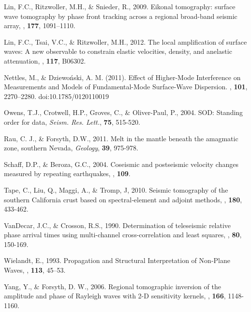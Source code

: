 \documentclass[referee]{gji}
\begin{document}
{{\begin{thebibliography}{}
	   Lin, F.C., Ritzwoller, M.H., \& Snieder, R., 2009. Eikonal tomography: surface wave tomography by phase front tracking across a regional broad-band seismic array, \textit{\gji}, \textbf{177}, 1091–1110. 

	   Lin, F.C., Tsai, V.C., \& Ritzwoller, M.H., 2012. The local amplification of surface waves: A new observable to constrain elastic velocities, density, and anelastic attenuation, \textit{\jgr}, \textbf{117}, B06302.

	   Nettles, M., \& Dziewoński, A. M. (2011). Effect of Higher-Mode Interference on Measurements and Models of Fundamental-Mode Surface-Wave Dispersion. \textit{\bssa}, \textbf{101}, 2270–2280. doi:10.1785/0120110019

	   Owens, T.J., Crotwell, H.P., Groves, C., \& Oliver-Paul, P., 2004. SOD: Standing order for data, \textit{Seism. Res. Lett.}, \textbf{75}, 515-520.

	   Rau, C. J., \& Forsyth, D.W., 2011. Melt in the mantle beneath the amagmatic zone, southern Nevada, \textit{Geology}, \textbf{39}, 975-978.

	   Schaff, D.P., \& Beroza, G.C., 2004. Coseismic and postseismic velocity changes measured by repeating earthquakes, \textit{\jgr}, \textbf{109}.

	   Tape, C., Liu, Q., Maggi, A., \& Tromp, J, 2010. Seismic tomography of the southern California crust based on spectral‐element and adjoint methods, \textit{\gji}, \textbf{180}, 433-462.

	   VanDecar, J.C., \& Crosson, R.S., 1990. Determination of teleseismic relative phase arrival times using multi-channel cross-correlation and least squares, \textit{\bssa}, \textbf{80}, 150-169.

	   Wielandt, E., 1993. Propagation and Structural Interpretation of Non‐Plane Waves, \textit{\gji}, \textbf{113}, 45–53.

	   Yang, Y., \& Forsyth, D. W., 2006. Regional tomographic inversion of the amplitude and phase of Rayleigh waves with 2-D sensitivity kernels, \textit{\gji}, \textbf{166}, 1148-1160.


\end{thebibliography}}}
\end{document}
